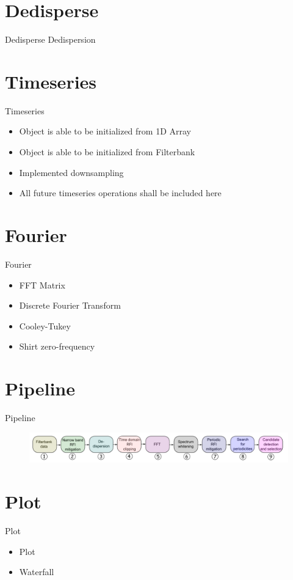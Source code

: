 \documentclass{beamer}
\begin{document}
\section{Dedisperse}
\begin{frame}{Dedisperse}
	Dedispersion
\end{frame}

\section{Timeseries}
\begin{frame}{Timeseries}
	\begin{itemize}
		\item Object is able to be initialized from 1D Array
		\item Object is able to be initialized from Filterbank
		\item Implemented downsampling
		\item All future timeseries operations shall be included here
	\end{itemize}
\end{frame}

\section{Fourier}
\begin{frame}{Fourier}
	\begin{itemize}
		\item FFT Matrix
		\item Discrete Fourier Transform
		\item Cooley-Tukey
		\item Shirt zero-frequency
	\end{itemize}
\end{frame}

\section{Pipeline}
\begin{frame}{Pipeline}
	\begin{figure}
		\includegraphics[width=\textwidth]{pipeline-order}
	\end{figure}
\end{frame}

\section{Plot}
\begin{frame}{Plot}
	\begin{itemize}
		\item Plot
		\item Waterfall
	\end{itemize}
\end{frame}
\end{document}
